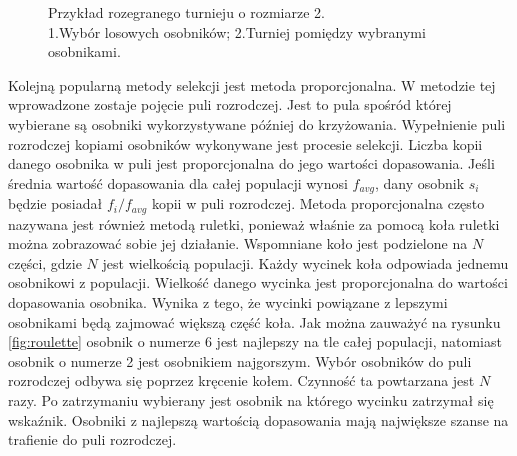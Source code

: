 \documentclass[twoside]{iisthesis}
\begin{document}
\begin{figure}[!htb]
	\centering
	\caption{Przykład rozegranego turnieju o rozmiarze 2.\\1.Wybór losowych osobników; 2.Turniej pomiędzy wybranymi osobnikami.}
	\label{fig:tournament}
\end{figure}

Kolejną popularną metody selekcji jest metoda proporcjonalna. W metodzie tej wprowadzone zostaje pojęcie puli rozrodczej. Jest to pula spośród której wybierane są osobniki wykorzystywane później do krzyżowania. Wypełnienie puli rozrodczej kopiami osobników wykonywane jest procesie selekcji. Liczba kopii danego osobnika w puli jest proporcjonalna do jego wartości dopasowania. Jeśli średnia wartość dopasowania dla całej populacji wynosi $f_{avg}$, dany osobnik $s_{i}$ będzie posiadał $f_{i}/f_{avg}$ kopii w puli rozrodczej. Metoda proporcjonalna często nazywana jest również metodą ruletki, ponieważ właśnie za pomocą koła ruletki można zobrazować sobie jej działanie. Wspomniane koło jest podzielone na $N$ części, gdzie $N$ jest wielkością populacji. Każdy wycinek koła odpowiada jednemu osobnikowi z populacji. Wielkość danego wycinka jest proporcjonalna do wartości dopasowania osobnika. Wynika z tego, że wycinki powiązane z lepszymi osobnikami będą zajmować większą część koła. Jak można zauważyć na rysunku \eqref{fig:roulette} osobnik o numerze 6 jest najlepszy na tle całej populacji, natomiast osobnik o numerze 2 jest osobnikiem najgorszym. Wybór osobników do puli rozrodczej odbywa się poprzez kręcenie kołem. Czynność ta powtarzana jest $N$ razy. Po zatrzymaniu wybierany jest osobnik na którego wycinku zatrzymał się wskaźnik. Osobniki z najlepszą wartością dopasowania mają największe szanse na trafienie do puli rozrodczej.
\end{document}
